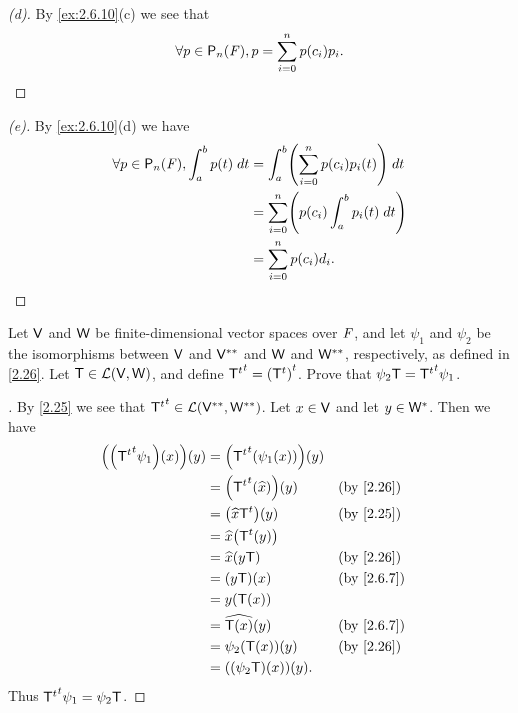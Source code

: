 \begin{proof}[(d)]
	By \cref{ex:2.6.10}(c) we see that
	\[
		\forall p \in \ps[n]{\F}, p = \sum_{i = 0}^n p(c_i) p_i.
	\]
\end{proof}

\begin{proof}[(e)]
	By \cref{ex:2.6.10}(d) we have
	\begin{align*}
		\forall p \in \ps[n]{\F}, \int_a^b p(t) \; dt & = \int_a^b \pa{\sum_{i = 0}^n p(c_i) p_i(t)} \; dt \\
		                                              & = \sum_{i = 0}^n \pa{p(c_i) \int_a^b p_i(t) \; dt} \\
		                                              & = \sum_{i = 0}^n p(c_i) d_i.
	\end{align*}
\end{proof}

\begin{ex}\label{ex:2.6.11}
	Let \(\mathsf{V}\) and \(\mathsf{W}\) be finite-dimensional vector spaces over \(\mathit{F}\), and let \(\psi_1\) and \(\psi_2\) be the isomorphisms between \(\mathsf{V}\) and \(\mathsf{V}^{**}\) and \(\mathsf{W}\) and \(\mathsf{W}^{**}\), respectively, as defined in \cref{2.26}.
	Let \(\mathsf{T} \in \mathcal{L}(\mathsf{V}, \mathsf{W})\), and define \({{\mathsf{T}}^{t}}^{t} = {\left\lparen{\mathsf{T}}^{t}\right\rparen}^{t}\).
	Prove that \(\psi_2 \mathsf{T} = {{\mathsf{T}}^{t}}^{t} \psi_1\).
\end{ex}

\begin{proof}[]
	By \cref{2.25} we see that \({{\mathsf{T}}^{t}}^{t} \in \mathcal{L}(\mathsf{V}^{**}, \mathsf{W}^{**})\).
	Let \(x \in \mathsf{V}\) and let \(y \in \mathsf{W}^*\).
	Then we have
	\begin{align*}
		\pa{\pa{\tp{\tp{\T}} \psi_1}(x)}(y) & = \pa{\tp{\tp{\T}}(\psi_1(x))}(y)                   \\
		                                    & = \pa{\tp{\tp{\T}}(\widehat{x})}(y) &  & \by{2.26}  \\
		                                    & = \pa{\widehat{x} \tp{\T}}(y)       &  & \by{2.25}  \\
		                                    & = \widehat{x}\pa{\tp{\T}(y)}                        \\
		                                    & = \widehat{x}(y \T)                 &  & \by{2.26}  \\
		                                    & = (y \T)(x)                         &  & \by{2.6.7} \\
		                                    & = y(\T(x))                                          \\
		                                    & = \widehat{\T(x)}(y)                &  & \by{2.6.7} \\
		                                    & = \psi_2(\T(x))(y)                  &  & \by{2.26}  \\
		                                    & = ((\psi_2 \T)(x))(y).
	\end{align*}
	Thus \({{\mathsf{T}}^{t}}^{t} \psi_1 = \psi_2 \mathsf{T}\).
\end{proof}

